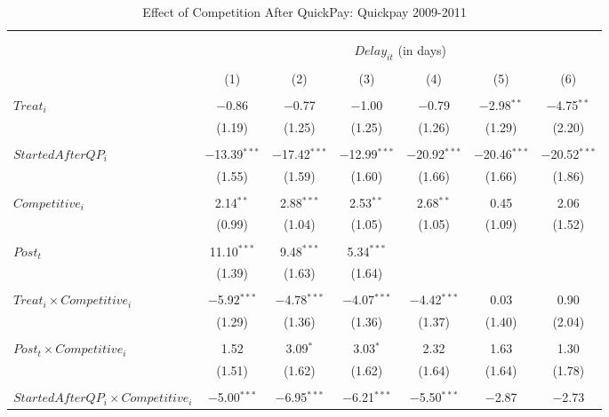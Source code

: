 \documentclass[
]{article}
\begin{document}
\begin{table}[H] \centering 
  \caption{Effect of Competition After QuickPay: Quickpay 2009-2011} 
  \label{} 
\small 
\begin{tabular}{@{\extracolsep{-3pt}}lcccccc} 
\\[-1.8ex]\hline 
\hline \\[-1.8ex] 
\\[-1.8ex] & \multicolumn{6}{c}{$Delay_{it}$ (in days)} \\ 
\\[-1.8ex] & (1) & (2) & (3) & (4) & (5) & (6)\\ 
\hline \\[-1.8ex] 
 $Treat_i$ & $-$0.86 & $-$0.77 & $-$1.00 & $-$0.79 & $-$2.98$^{**}$ & $-$4.75$^{**}$ \\ 
  & (1.19) & (1.25) & (1.25) & (1.26) & (1.29) & (2.20) \\ 
  & & & & & & \\ 
 $StartedAfterQP_i$ & $-$13.39$^{***}$ & $-$17.42$^{***}$ & $-$12.99$^{***}$ & $-$20.92$^{***}$ & $-$20.46$^{***}$ & $-$20.52$^{***}$ \\ 
  & (1.55) & (1.59) & (1.60) & (1.66) & (1.66) & (1.86) \\ 
  & & & & & & \\ 
 $Competitive_i$ & 2.14$^{**}$ & 2.88$^{***}$ & 2.53$^{**}$ & 2.68$^{**}$ & 0.45 & 2.06 \\ 
  & (0.99) & (1.04) & (1.05) & (1.05) & (1.09) & (1.52) \\ 
  & & & & & & \\ 
 $Post_t$ & 11.10$^{***}$ & 9.48$^{***}$ & 5.34$^{***}$ &  &  &  \\ 
  & (1.39) & (1.63) & (1.64) &  &  &  \\ 
  & & & & & & \\ 
 $Treat_i \times Competitive_i$ & $-$5.92$^{***}$ & $-$4.78$^{***}$ & $-$4.07$^{***}$ & $-$4.42$^{***}$ & 0.03 & 0.90 \\ 
  & (1.29) & (1.36) & (1.36) & (1.37) & (1.40) & (2.04) \\ 
  & & & & & & \\ 
 $Post_t \times Competitive_i$ & 1.52 & 3.09$^{*}$ & 3.03$^{*}$ & 2.32 & 1.63 & 1.30 \\ 
  & (1.51) & (1.62) & (1.62) & (1.64) & (1.64) & (1.78) \\ 
  & & & & & & \\ 
 $StartedAfterQP_i \times Competitive_i$ & $-$5.00$^{***}$ & $-$6.95$^{***}$ & $-$6.21$^{***}$ & $-$5.50$^{***}$ & $-$2.87 & $-$2.73 \\ 

\end{tabular}
\end{table}
\end{document}
